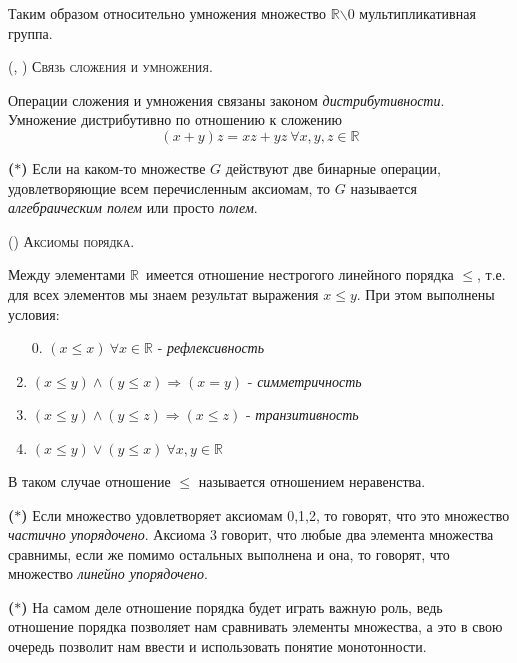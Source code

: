 \documentclass[a4paper,14pt]{report}
\newcommand{\setR}{\ensuremath{\mathbb R}}
\renewcommand{\leq}{\leqslant}
\newcommand{\rom}[1]{\MakeUppercase{\romannumeral #1}}
\begin{document}
   \noindent Таким образом относительно умножения множество \setR $ \backslash 0 $ мультипликативная группа.  
   
   \vspace{0.3cm}
   (\rom{1}, \rom{2}) \textsc{Связь сложения и умножения.} \par
   Операции сложения и умножения связаны законом \textit{дистрибутивности}. Умножение дистрибутивно по отношению к сложению \[ (x + y)z = xz + yz\ \forall x, y, z \in \setR \]
   
   \noindent \textbf{($ \ast $)} Если на каком-то множестве $ G $ действуют две бинарные операции, удовлетворяющие всем перечисленным аксиомам, то $ G $ называется \textit{алгебраическим полем} или просто \textit{полем}.
   
   \vspace{0.3cm}
   (\rom{3}) \textsc{Аксиомы порядка.} \par
   Между элементами \setR\ имеется отношение нестрогого линейного порядка $ \leq $, т.е. для всех элементов мы знаем результат\footnotemark{} выражения $ x \leq y $. При этом выполнены условия:
   
    \begin{enumerate}
    	\item[0.] $ (x \leq x)\ \forall x \in \setR $ - \textit{рефлексивность}
    	\item $ (x \leq y) \wedge (y \leq x) \Rightarrow (x = y) $ - \textit{симметричность}
    	\item $ (x \leq y) \wedge (y \leq z) \Rightarrow (x \leq z) $ - \textit{транзитивность}
    	\item $ (x \leq y) \vee (y \leq x)\ \forall x, y \in \setR $
	\end{enumerate}
   
    В таком случае отношение $ \leq $ называется отношением неравенства. 
    
    \noindent \textbf{($ \ast $)} Если множество удовлетворяет аксиомам 0,1,2, то говорят, что это множество \textit{частично упорядочено}. Аксиома 3 говорит, что любые два элемента множества сравнимы, если же помимо остальных выполнена и она, то говорят, что множество \textit{линейно упорядочено}.
    
    \noindent \textbf{($ \ast $)} На самом деле отношение порядка будет играть важную роль, ведь отношение порядка позволяет нам сравнивать элементы множества, а это в свою очередь позволит нам ввести и использовать понятие монотонности. 
    
\end{document}
